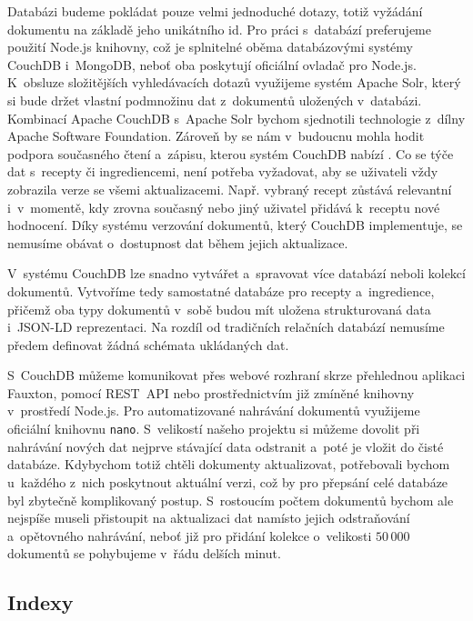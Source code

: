 Databázi budeme pokládat pouze velmi jednoduché dotazy, totiž vyžádání dokumentu na základě jeho unikátního id. Pro práci s~databází preferujeme použití Node.js knihovny, což je splnitelné oběma databázovými systémy CouchDB i~MongoDB, neboť oba poskytují oficiální ovladač pro Node.js. K~obsluze složitějších vyhledávacích dotazů využijeme systém Apache Solr, který si bude držet vlastní podmnožinu dat z~dokumentů uložených v~databázi. Kombinací Apache CouchDB s~Apache Solr bychom sjednotili technologie z~dílny Apache Software Foundation. Zároveň by se nám v~budoucnu mohla hodit podpora současného čtení a~zápisu, kterou systém CouchDB nabízí \citep{mongodb-vs-couchdb}. Co se týče dat s~recepty či ingrediencemi, není potřeba vyžadovat, aby se uživateli vždy zobrazila verze se všemi aktualizacemi. Např. vybraný recept zůstává relevantní i~v~momentě, kdy zrovna současný nebo jiný uživatel přidává k~receptu nové hodnocení. Díky systému verzování dokumentů, který CouchDB implementuje, se nemusíme obávat o~dostupnost dat během jejich aktualizace.

V~systému CouchDB lze snadno vytvářet a~spravovat více databází neboli kolekcí dokumentů. Vytvoříme tedy samostatné databáze pro recepty a~ingredience, přičemž oba typy dokumentů v~sobě budou mít uložena strukturovaná data i~JSON-LD reprezentaci. Na rozdíl od tradičních relačních databází nemusíme předem definovat žádná schémata ukládaných dat.

S~CouchDB můžeme komunikovat přes webové rozhraní skrze přehlednou aplikaci Fauxton, pomocí REST~API nebo prostřednictvím již zmíněné knihovny v~prostředí Node.js. Pro automatizované nahrávání dokumentů využijeme oficiální knihovnu \texttt{nano}. S~velikostí našeho projektu si můžeme dovolit při nahrávání nových dat nejprve stávající data odstranit a~poté je vložit do čisté databáze. Kdybychom totiž chtěli dokumenty aktualizovat, potřebovali bychom u~každého z~nich poskytnout aktuální verzi, což by pro přepsání celé databáze byl zbytečně komplikovaný postup. S~rostoucím počtem dokumentů bychom ale nejspíše museli přistoupit na aktualizaci dat namísto jejich odstraňování a~opětovného nahrávání, neboť již pro přidání kolekce o~velikosti $50\,000$ dokumentů se pohybujeme v~řádu delších minut.

\subsection{Indexy}

